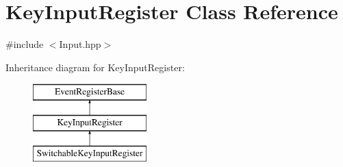 \hypertarget{class_key_input_register}{\section{Key\-Input\-Register Class Reference}
\label{class_key_input_register}
}


{\ttfamily \#include $<$Input.\-hpp$>$}

Inheritance diagram for Key\-Input\-Register\-:\begin{figure}[H]
\begin{center}
\leavevmode
\includegraphics[height=3.000000cm]{class_key_input_register}
\end{center}
\end{figure}
